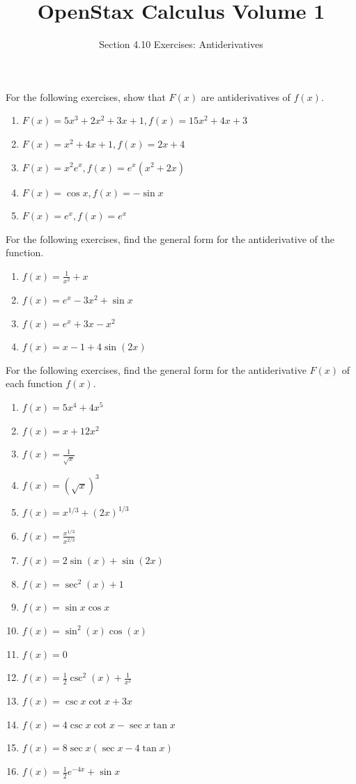 \documentclass{exercises}
\title{OpenStax Calculus Volume 1}
\subtitle{Section 4.10 Exercises: Antiderivatives}
\author{}
\date{}
\begin{document}
\maketitle


For the following exercises, show that $F(x)$ are antiderivatives of $f(x)$.

\begin{enumerate}[start=1]
\item $F(x)=5x^{3}+2x^{2}+3x+1,f(x)=15x^{2}+4x+3$
\item $F(x)=x^{2}+4x+1,f(x)=2x+4$
\item $F(x)=x^{2}e^{x},f(x)=e^{x}(x^{2}+2x)$
\item $F(x)=\cos x,f(x)=-\sin x$
\item $F(x)=e^{x},f(x)=e^{x}$
\end{enumerate}

For the following exercises, find the general form for the antiderivative of the function.

\begin{enumerate}[resume]
\item $f(x)=\frac{1}{x^{2}}+x$
\item $f(x)=e^{x}-3x^{2}+\sin x$
\item $f(x)=e^{x}+3x-x^{2}$
\item $f(x)=x-1+4\sin(2x)$
\end{enumerate}

For the following exercises, find the general form for the antiderivative $F(x)$ of each function $f(x)$.

\begin{enumerate}[resume]
\item $f(x)=5x^{4}+4x^{5}$
\item $f(x)=x+12x^{2}$
\item $f(x)=\frac{1}{\sqrt{x}}$
\item $f(x)={(\sqrt{x})}^{3}$
\item $f(x)=x^{1/3}+{(2x)}^{1/3}$
\item $f(x)=\frac{x^{1/3}}{x^{2/3}}$
\item $f(x)=2\sin(x)+\sin(2x)$
\item $f(x)=\sec^{2}(x)+1$
\item $f(x)=\sin x\cos x$
\item $f(x)=\sin^{2}(x)\cos(x)$
\item $f(x)=0$
\item $f(x)=\frac{1}{2}\csc^{2}(x)+\frac{1}{x^{2}}$
\item $f(x)=\csc x\cot x+3x$
\item $f(x)=4\csc x\cot x-\sec x\tan x$
\item $f(x)=8\sec x(\sec x-4\tan x)$
\item $f(x)=\frac{1}{2}e^{-4x}+\sin x$
\end{enumerate}
\end{document}
